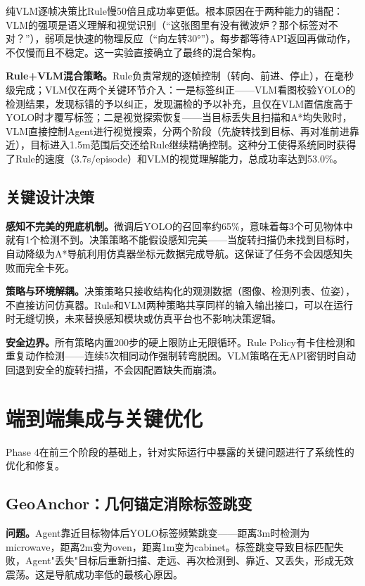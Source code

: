 \documentclass{SYSUReport}
\begin{document}
纯VLM逐帧决策比Rule慢50倍且成功率更低。根本原因在于两种能力的错配：VLM的强项是语义理解和视觉识别（“这张图里有没有微波炉？那个标签对不对？”），弱项是快速的物理反应（“向左转30°”）。每步都等待API返回再做动作，不仅慢而且不稳定。这一实验直接确立了最终的混合架构。

\textbf{Rule+VLM混合策略。}Rule负责常规的逐帧控制（转向、前进、停止），在毫秒级完成；VLM仅在两个关键环节介入：一是标签纠正——VLM看图校验YOLO的检测结果，发现标错的予以纠正，发现漏检的予以补充，且仅在VLM置信度高于YOLO时才覆写标签；二是视觉探索恢复——当目标丢失且扫描和A*均失败时，VLM直接控制Agent进行视觉搜索，分两个阶段（先旋转找到目标、再对准前进靠近），目标进入1.5m范围后交还给Rule继续精确控制。这种分工使得系统同时获得了Rule的速度（3.7s/episode）和VLM的视觉理解能力，总成功率达到53.0\%。

\subsection{关键设计决策}

\textbf{感知不完美的兜底机制。}微调后YOLO的召回率约65\%，意味着每3个可见物体中就有1个检测不到。决策策略不能假设感知完美——当旋转扫描仍未找到目标时，自动降级为A*导航利用仿真器坐标元数据完成导航。这保证了任务不会因感知失败而完全卡死。

\textbf{策略与环境解耦。}决策策略只接收结构化的观测数据（图像、检测列表、位姿），不直接访问仿真器。Rule和VLM两种策略共享同样的输入输出接口，可以在运行时无缝切换，未来替换感知模块或仿真平台也不影响决策逻辑。

\textbf{安全边界。}所有策略内置200步的硬上限防止无限循环。Rule Policy有卡住检测和重复动作检测——连续5次相同动作强制转弯脱困。VLM策略在无API密钥时自动回退到安全的旋转扫描，不会因配置缺失而崩溃。

\section{端到端集成与关键优化}

Phase 4在前三个阶段的基础上，针对实际运行中暴露的关键问题进行了系统性的优化和修复。

\subsection{GeoAnchor：几何锚定消除标签跳变}

\textbf{问题。}Agent靠近目标物体后YOLO标签频繁跳变——距离3m时检测为microwave，距离2m变为oven，距离1m变为cabinet。标签跳变导致目标匹配失败，Agent"丢失"目标后重新扫描、走远、再次检测到、靠近、又丢失，形成无效震荡。这是导航成功率低的最核心原因。
\end{document}
